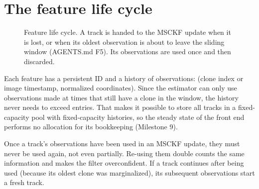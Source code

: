 \section{The feature life cycle}

\begin{figure}[h]
\centering
{}
\caption{Feature life cycle. A track is handed to the MSCKF update when it is lost, or when its oldest observation is about to leave the sliding window
(AGENTS.md F5). Its observations are used once and then discarded.}
\label{fig:lifecycle}
\end{figure}

Each feature has a persistent ID and a history of observations: (clone index or image timestamp, normalized coordinates). Since the estimator can only use
observations made at times that still have a clone in the window, the history never needs to exceed  entries. That makes it possible to store all
tracks in a fixed-capacity pool with fixed-capacity histories, so the steady state of the front end performs no allocation for its bookkeeping (Milestone 9).

\begin{pitfall}
Once a track's observations have been used in an MSCKF update, they must never be used again, not even partially. Re-using them double counts the same information
and makes the filter overconfident. If a track continues after being used (because its oldest clone was marginalized), its subsequent observations start a fresh
track.
\end{pitfall}

